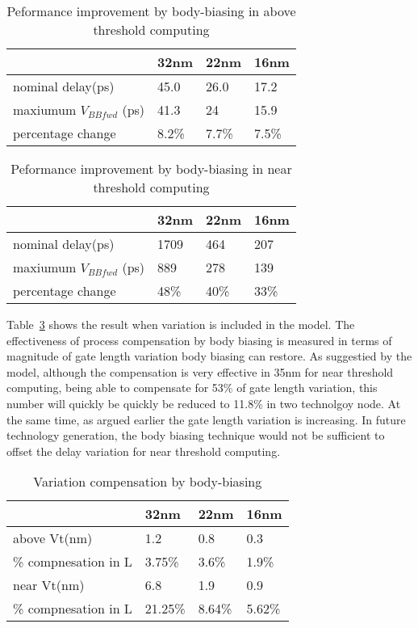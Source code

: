 \begin{table}
  \caption {Peformance improvement by body-biasing in above threshold computing} 
  \centering 
  \label {body1}
  \begin{tabular}{ | l | l | l | l | }
    \hline
    & 32nm & 22nm & 16nm \\ \hline
    nominal delay(ps) & 45.0 & 26.0 & 17.2 \\ \hline
    maxiumum $V_{BBfwd}$ (ps)  & 41.3 & 24 & 15.9 \\  \hline
    percentage change  & 8.2\% & 7.7\% & 7.5\% \\ 
    \hline
  \end{tabular}
\end{table}



\begin{table}
  \caption {Peformance improvement by body-biasing in near threshold computing}  
  \centering
  \label {body2}
  \begin{tabular}{ | l | l | l | l | }
    \hline
    & 32nm & 22nm & 16nm \\ \hline
    nominal delay(ps) & 1709 & 464 & 207 \\ \hline
    maxiumum $V_{BBfwd}$ (ps)  & 889 & 278 & 139 \\  \hline
    percentage change  & 48\% & 40\% & 33\% \\ 
    \hline
  \end{tabular}
\end{table}

Table~\ref{compensation} shows the result when variation is included in the model. The effectiveness of process compensation by body biasing is measured in terms of magnitude of gate length variation body biasing can restore. As suggestied by the model, although the compensation is very effective in 35nm for near threshold computing, being able to compensate for 53\% of gate length variation, this number will quickly be quickly be reduced to 11.8\% in two technolgoy node. At the same time, as argued earlier the gate length variation is increasing. In future technology generation, the body biasing technique would not be sufficient to offset the delay variation for near threshold computing.    

\begin{table}
  \caption {Variation compensation by body-biasing}  
  \centering
  \label {compensation}
  \begin{tabular}{ | l | l | l | l | }
    \hline
    & 32nm & 22nm & 16nm \\ \hline
    above Vt(nm) & 1.2 & 0.8 & 0.3 \\ \hline
    \% compnesation in L  & 3.75\% & 3.6\% & 1.9\% \\ \hline
    near Vt(nm)  & 6.8 & 1.9 & 0.9\\  \hline
    \% compnesation in L & 21.25\% & 8.64\% & 5.62\% \\ 
    \hline
  \end{tabular}
\end{table}